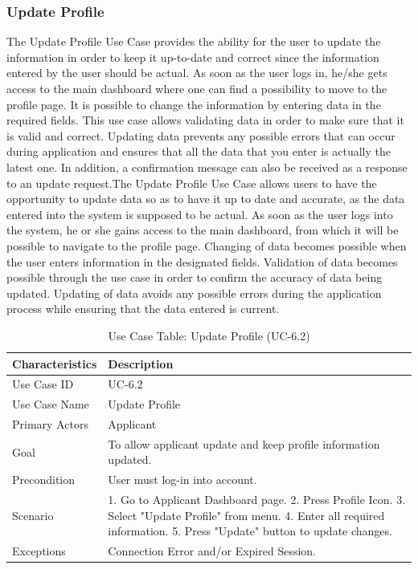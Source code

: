 \subsubsection{Update Profile}
The Update Profile Use Case provides the ability for the user to update the information in order to keep it up-to-date and correct since the information entered by the user should be actual. As soon as the user logs in, he/she gets access to the main dashboard where one can find a possibility to move to the profile page. It is possible to change the information by entering data in the required fields. This use case allows validating data in order to make sure that it is valid and correct. Updating data prevents any possible errors that can occur during application and ensures that all the data that you enter is actually the latest one. In addition, a confirmation message can also be received as a response to an update request.The Update Profile Use Case allows users to have the opportunity to update data so as to have it up to date and accurate, as the data entered into the system is supposed to be actual. As soon as the user logs into the system, he or she gains access to the main dashboard, from which it will be possible to navigate to the profile page. Changing of data becomes possible when the user enters information in the designated fields. Validation of data becomes possible through the use case in order to confirm the accuracy of data being updated. Updating of data avoids any possible errors during the application process while ensuring that the data entered is current.
\begin{table}[H]
    \centering
    \small
    \renewcommand{\arraystretch}{1.4}
    \caption{Use Case Table: Update Profile (UC-6.2)}
    \label{tab:update_profile}
    
    \begin{tabularx}{\textwidth}{|l|X|}
        \hline
        \rowcolor[gray]{0.9} {Characteristics} & {Description} \\ \hline
        Use Case ID & UC-6.2 \\ \hline
        Use Case Name & Update Profile \\ \hline
        Primary Actors & Applicant \\ \hline
        Goal & To allow applicant update and keep profile information updated. \\ \hline
        Precondition & User must log-in into account. \\ \hline
        Scenario & 1. Go to Applicant Dashboard page. 2. Press Profile Icon. 3. Select "Update Profile" from menu. 4. Enter all required information. 5. Press "Update" button to update changes. \\ \hline
        Exceptions & Connection Error and/or Expired Session. \\ \hline
    \end{tabularx}
\end{table}
\FloatBarrier